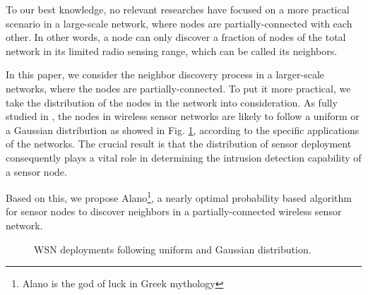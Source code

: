 To our best knowledge, no relevant researches have focused on a more 
practical scenario in a large-scale network, where nodes are partially-connected
with each other. In other words, a node can only discover a fraction of nodes of the
total network in its limited radio sensing range, which can be called its neighbors.





 
 
 In this paper, we consider the neighbor discovery process in a larger-scale networks,
 where the nodes are partially-connected. To put it more practical, 
 we take the distribution of the nodes in the network into consideration.
 As fully studied in \cite{wang2013gaussian} , the nodes in wireless sensor networks are likely to 
 follow a uniform or a Gaussian distribution as showed in Fig. \ref{distribution}, according to the specific applications of the networks.
 The crucial result is that the distribution of sensor deployment consequently plays a vital role in 
 determining the intrusion detection capability of a sensor node.

Based on this, we propose Alano\footnote{Alano is the god of luck in Greek mythology }, 
a nearly optimal probability based algorithm for sensor nodes to discover neighbors 
in a partially-connected wireless sensor network.
 
 \begin{figure}[!t]
\centering
{}
\vspace{0.03in}
\caption{WSN deployments following uniform and Gaussian distribution.}
\label{distribution}
\end{figure}


